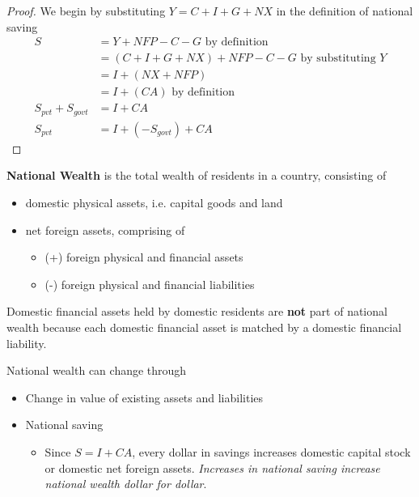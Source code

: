 \begin{proof}
    We begin by substituting $Y = C + I + G + NX$ in the definition of national saving 
    \begin{align*}
        S &= Y + NFP - C - G \text{ by definition} \\
        &= (C + I + G + NX) + NFP - C - G \text{ by substituting } Y \\
        &= I + (NX + NFP) \\
        &= I + (CA) \text{ by definition} \\
        S_{pvt} + S_{govt} &= I + CA  \\
        S_{pvt} &= I + (- S_{govt}) + CA
    \end{align*}
\end{proof}

\begin{definition}
    \textbf{National Wealth} is the total wealth of residents in a country, consisting of 
    \begin{itemize}
        \item domestic physical assets, i.e. capital goods and land
        \item net foreign assets, comprising of 
        \begin{itemize}
            \item (+) foreign physical and financial assets 
            \item (-) foreign physical and financial liabilities 
        \end{itemize} 
    \end{itemize} 
\end{definition}

\begin{remark}
    Domestic financial assets held by domestic residents are \textbf{not} part of national wealth because each domestic financial asset is matched by a domestic financial liability.
\end{remark}

\begin{remark}
    National wealth can change through
    \begin{itemize}
        \item Change in value of existing assets and liabilities
        \item National saving
        \begin{itemize}
            \item Since $S = I + CA$, every dollar in savings increases domestic capital stock or domestic net foreign assets. \textit{Increases in national saving increase national wealth dollar for dollar}.
        \end{itemize} 
    \end{itemize} 
\end{remark}

